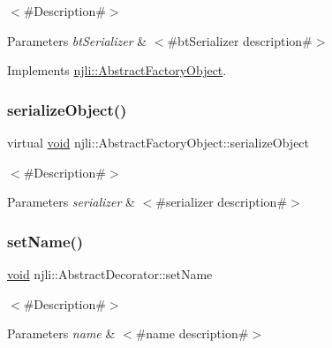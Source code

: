$<$\#\+Description\#$>$


\begin{DoxyParams}{Parameters}
{\em bt\+Serializer} & $<$\#bt\+Serializer description\#$>$ \\
\hline
\end{DoxyParams}


Implements \mbox{\hyperlink{classnjli_1_1_abstract_factory_object_aad2fbe86fb3bdecf02918a96b9c57976}{njli\+::\+Abstract\+Factory\+Object}}.

\mbox{\label{classnjli_1_1_world_state_a4fc4bcd9d1930911474210c047372fc0}} 
\subsubsection{\texorpdfstring{serialize\+Object()}{serializeObject()}}
{\footnotesize\ttfamily virtual \mbox{\hyperlink{_thread_8h_af1e856da2e658414cb2456cb6f7ebc66}{void}} njli\+::\+Abstract\+Factory\+Object\+::serialize\+Object}

$<$\#\+Description\#$>$


\begin{DoxyParams}{Parameters}
{\em serializer} & $<$\#serializer description\#$>$ \\
\hline
\end{DoxyParams}
\mbox{\label{classnjli_1_1_world_state_a087eb5f8d9f51cc476f12f1d10a3cb95}} 
\subsubsection{\texorpdfstring{set\+Name()}{setName()}}
{\footnotesize\ttfamily \mbox{\hyperlink{_thread_8h_af1e856da2e658414cb2456cb6f7ebc66}{void}} njli\+::\+Abstract\+Decorator\+::set\+Name}

$<$\#\+Description\#$>$


\begin{DoxyParams}{Parameters}
{\em name} & $<$\#name description\#$>$ \\
\hline
\end{DoxyParams}
\mbox{\label{classnjli_1_1_world_state_a22b207cf794a74c4cccb41c5ba893a26}} 
